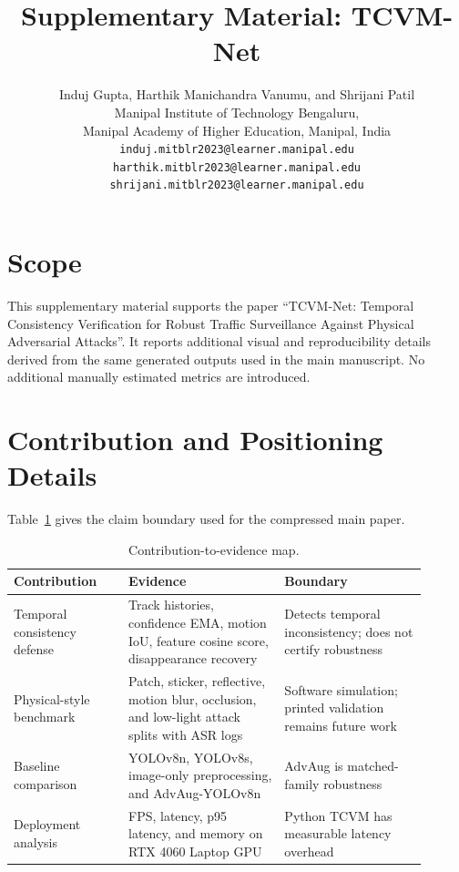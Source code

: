 \documentclass[11pt,a4paper]{article}
\title{Supplementary Material: TCVM-Net}
\author{Induj Gupta, Harthik Manichandra Vanumu, and Shrijani Patil\\
Manipal Institute of Technology Bengaluru,\\
Manipal Academy of Higher Education, Manipal, India\\
\texttt{induj.mitblr2023@learner.manipal.edu}\\
\texttt{harthik.mitblr2023@learner.manipal.edu}\\
\texttt{shrijani.mitblr2023@learner.manipal.edu}}
\date{}
\begin{document}
\maketitle

\section{Scope}
This supplementary material supports the paper ``TCVM-Net: Temporal Consistency Verification for Robust Traffic Surveillance Against Physical Adversarial Attacks''. It reports additional visual and reproducibility details derived from the same generated outputs used in the main manuscript. No additional manually estimated metrics are introduced.

\section{Contribution and Positioning Details}
Table~\ref{tab:supp_contrib} gives the claim boundary used for the compressed main paper.

\begin{table}[ht]
\centering
\small
\caption{Contribution-to-evidence map.}
\label{tab:supp_contrib}
\begin{tabular}{p{0.25\linewidth}p{0.34\linewidth}p{0.31\linewidth}}
\toprule
Contribution & Evidence & Boundary \\
\midrule
Temporal consistency defense & Track histories, confidence EMA, motion IoU, feature cosine score, disappearance recovery & Detects temporal inconsistency; does not certify robustness \\
Physical-style benchmark & Patch, sticker, reflective, motion blur, occlusion, and low-light attack splits with ASR logs & Software simulation; printed validation remains future work \\
Baseline comparison & YOLOv8n, YOLOv8s, image-only preprocessing, and AdvAug-YOLOv8n & AdvAug is matched-family robustness \\
Deployment analysis & FPS, latency, p95 latency, and memory on RTX 4060 Laptop GPU & Python TCVM has measurable latency overhead \\
\bottomrule
\end{tabular}
\end{table}
\FloatBarrier
\end{document}
